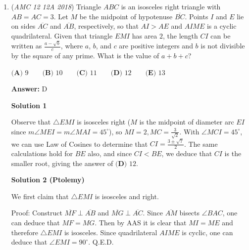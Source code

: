 \begin{enumerate}
 The total sum for $x$ is $\frac{1}{2}+\frac{\text{a geometric sequence}}{\frac{2}{3}}$, and that geometric sequence evaluates to $\frac{\frac{1}{5}}{1-\frac{1}{5}}=\frac{1}{4}$. Then we just need to do the computation.

 $x$ is $\frac{\frac14}{\frac23}+\frac12=\frac78$. Recalling our answer is $\frac{x}{\frac12}+2$, we can plug in $x$ to get a final answer of $\frac{7}{4}+2=\frac{15}{4}$. 

 Finally, we can add $15+4=\boxed{\textbf{(C) } 19}$.

 


	\item (\textit{AMC 12 12A 2018}) Triangle $ABC$ is an isosceles right triangle with $AB=AC=3$. Let $M$ be the midpoint of hypotenuse $\overline{BC}$. Points $I$ and $E$ lie on sides $\overline{AC}$ and $\overline{AB}$, respectively, so that $AI>AE$ and $AIME$ is a cyclic quadrilateral. Given that triangle $EMI$ has area $2$, the length $CI$ can be written as $\frac{a-\sqrt{b}}{c}$, where $a$, $b$, and $c$ are positive integers and $b$ is not divisible by the square of any prime. What is the value of $a+b+c$?


 $\textbf{(A) }9 \qquad \textbf{(B) }10 \qquad \textbf{(C) }11 \qquad \textbf{(D) }12 \qquad \textbf{(E) }13 \qquad$

 \textbf{Answer: }D



\textbf{Solution 1}

Observe that $\triangle{EMI}$ is isosceles right ($M$ is the midpoint of diameter arc $EI$ since $m\angle MEI = m\angle MAI = 45^\circ$), so $MI=2,MC=\frac{3}{\sqrt{2}}$. With $\angle{MCI}=45^\circ$, we can use Law of Cosines to determine that $CI=\frac{3\pm\sqrt{7}}{2}$. The same calculations hold for $BE$ also, and since $CI<BE$, we deduce that $CI$ is the smaller root, giving the answer of $\boxed{\textbf{(D) }12}$.

 



\textbf{Solution 2 (Ptolemy)}

We first claim that $\triangle{EMI}$ is isosceles and right.

 Proof: Construct $\overline{MF}\perp\overline{AB}$ and $\overline{MG}\perp\overline{AC}$. Since $\overline{AM}$ bisects $\angle{BAC}$, one can deduce that $MF=MG$. Then by AAS it is clear that $MI=ME$ and therefore $\triangle{EMI}$ is isosceles. Since quadrilateral $AIME$ is cyclic, one can deduce that $\angle{EMI}=90^\circ$. Q.E.D.


\end{enumerate}
